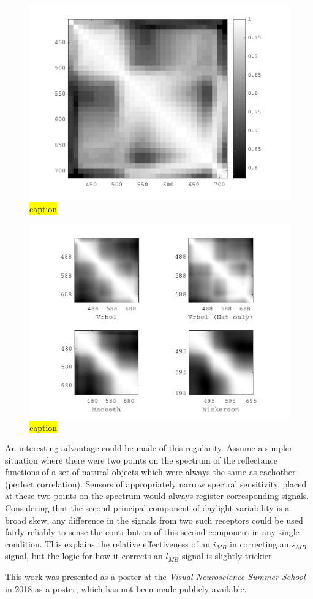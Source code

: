 \begin{figure}[htbp]
 \includegraphics[max width=\textwidth]{figs/comp/nat_cor/foster.pdf}
 \caption{\hl{caption}}
 \label{fig:foster}
\end{figure} 

\begin{figure}[htbp]
 \includegraphics[max width=\textwidth]{figs/comp/nat_cor/others.pdf}
 \caption{\hl{caption}}
 \label{fig:others}
\end{figure} 

An interesting advantage could be made of this regularity. Assume a simpler situation where there were two points on the spectrum of the reflectance functions of a set of natural objects which were always the same as eachother (perfect correlation). Sensors of appropriately narrow spectral sensitivity, placed at these two points on the spectrum would always register corresponding signals. Considering that the second principal component of daylight variability is a broad skew, any difference in the signals from two such receptors could be used fairly reliably to sense the contribution of this second component in any single condition. This explains the relative effectiveness of an $i_{MB}$ in correcting an $s_{MB}$ signal, but the logic for how it corrects an $l_{MB}$ signal is slightly trickier.

This work was presented as a poster at the \emph{Visual Neuroscience Summer School} in 2018 as a poster, which has not been made publicly available.